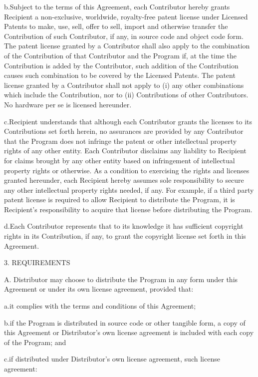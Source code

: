 b.Subject to the terms of this Agreement, each Contributor hereby
grants Recipient a non-exclusive, worldwide, royalty-free patent
license under Licensed Patents to make, use, sell, offer to sell,
import and otherwise transfer the Contribution of such Contributor, if
any, in source code and object code form. The patent license granted
by a Contributor shall also apply to the combination of the
Contribution of that Contributor and the Program if, at the time the
Contribution is added by the Contributor, such addition of the
Contribution causes such combination to be covered by the Licensed
Patents. The patent license granted by a Contributor shall not apply
to (i) any other combinations which include the Contribution, nor to
(ii) Contributions of other Contributors. No hardware per se is
licensed hereunder. 

c.Recipient understands that although each Contributor grants the
licenses to its Contributions set forth herein, no assurances are
provided by any Contributor that the Program does not infringe the
patent or other intellectual property rights of any other entity. Each
Contributor disclaims any liability to Recipient for claims brought by
any other entity based on infringement of intellectual property rights
or otherwise. As a condition to exercising the rights and licenses
granted hereunder, each Recipient hereby assumes sole responsibility
to secure any other intellectual property rights needed, if any. For
example, if a third party patent license is required to allow
Recipient to distribute the Program, it is Recipient's responsibility
to acquire that license before distributing the Program. 

d.Each Contributor represents that to its knowledge it has sufficient
copyright rights in its Contribution, if any, to grant the copyright
license set forth in this Agreement. 



3. REQUIREMENTS 

A. Distributor may choose to distribute the Program in any form under
this Agreement or under its own license agreement, provided that: 

a.it complies with the terms and conditions of this Agreement; 

b.if the Program is distributed in source code or other tangible form,
a copy of this Agreement or Distributor's own license agreement is
included with each copy of the Program; and 

c.if distributed under Distributor's own license agreement, such
license agreement: 

